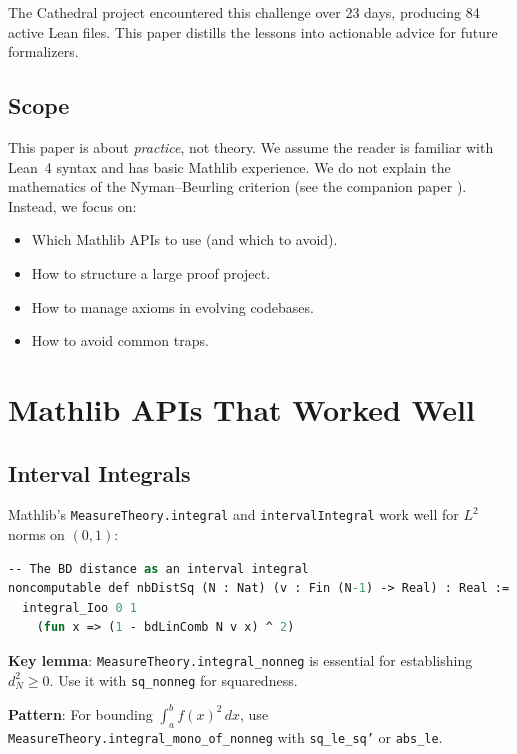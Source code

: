 \documentclass[11pt,a4paper]{article}
\newcommand{\lean}[1]{\texttt{#1}}
\begin{document}
The Cathedral project encountered this challenge over 23 days,
producing 84 active Lean files. This paper distills the lessons
into actionable advice for future formalizers.

\subsection{Scope}

This paper is about \emph{practice}, not theory. We assume the reader
is familiar with Lean~4 syntax and has basic Mathlib experience. We
do not explain the mathematics of the Nyman--Beurling criterion
(see the companion paper \cite{cathedral-math}). Instead, we focus on:

\begin{itemize}
  \item Which Mathlib APIs to use (and which to avoid).
  \item How to structure a large proof project.
  \item How to manage axioms in evolving codebases.
  \item How to avoid common traps.
\end{itemize}

\section{Mathlib APIs That Worked Well}
\label{sec:good-apis}

\subsection{Interval Integrals}

Mathlib's \lean{MeasureTheory.integral} and
\lean{intervalIntegral} work well for $L^2$ norms on $(0,1)$:

\begin{lstlisting}[language=ML,caption={L2 norm on (0,1)}]
-- The BD distance as an interval integral
noncomputable def nbDistSq (N : Nat) (v : Fin (N-1) -> Real) : Real :=
  integral_Ioo 0 1
    (fun x => (1 - bdLinComb N v x) ^ 2)
\end{lstlisting}

\textbf{Key lemma}: \lean{MeasureTheory.integral\_nonneg} is
essential for establishing $d_N^2 \geq 0$. Use it with
\lean{sq\_nonneg} for squaredness.

\textbf{Pattern}: For bounding $\int_a^b f(x)^2\,dx$, use
\lean{MeasureTheory.integral\_mono\_of\_nonneg} with
\lean{sq\_le\_sq'} or \lean{abs\_le}.
\end{document}
